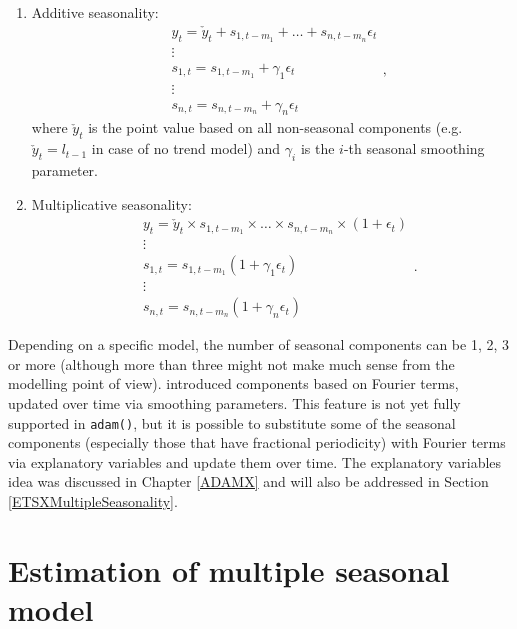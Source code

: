 \documentclass[
]{book}
\theoremstyle{definition}
\theoremstyle{definition}
\theoremstyle{definition}
\theoremstyle{definition}
\theoremstyle{remark}
\begin{document}
\begin{enumerate}
\def\labelenumi{\arabic{enumi}.}
\item
  Additive seasonality:
  \begin{equation}
    \begin{aligned}
   & {y}_{t} = \check{y}_t + s_{1,t-m_1} + \dots + s_{n,t-m_n} \epsilon_t \\
   & \vdots \\
   & s_{1,t} = s_{1,t-m_1} + \gamma_1 \epsilon_t \\
   & \vdots \\
   & s_{n,t} = s_{n,t-m_n} + \gamma_n \epsilon_t
    \end{aligned},
    \label{eq:ETSADAMAdditiveSeasonality}
  \end{equation}
  where \(\check{y}_t\) is the point value based on all non-seasonal components (e.g.~\(\check{y}_t=l_{t-1}\) in case of no trend model) and \(\gamma_i\) is the \(i\)-th seasonal smoothing parameter.
\item
  Multiplicative seasonality:
  \begin{equation}
    \begin{aligned}
   & {y}_{t} = \check{y}_t \times s_{1,t-m_1} \times \dots \times s_{n,t-m_n} \times(1+\epsilon_t) \\
   & \vdots \\
   & s_{1,t} = s_{1,t-m_1} (1 + \gamma_1 \epsilon_t) \\
   & \vdots \\
   & s_{n,t} = s_{n,t-m_n} (1+ \gamma_n \epsilon_t)
    \end{aligned}.
  \label{eq:ETSADAMMultiplicativeSeasonality}
  \end{equation}
\end{enumerate}

Depending on a specific model, the number of seasonal components can be 1, 2, 3 or more (although more than three might not make much sense from the modelling point of view). \citet{DeLivera2010} introduced components based on Fourier terms, updated over time via smoothing parameters. This feature is not yet fully supported in \texttt{adam()}, but it is possible to substitute some of the seasonal components (especially those that have fractional periodicity) with Fourier terms via explanatory variables and update them over time. The explanatory variables idea was discussed in Chapter \ref{ADAMX} and will also be addressed in Section \ref{ETSXMultipleSeasonality}.

\hypertarget{ADAMMultiplIssues}{%
\section{Estimation of multiple seasonal model}\label{ADAMMultiplIssues}}
\end{document}
